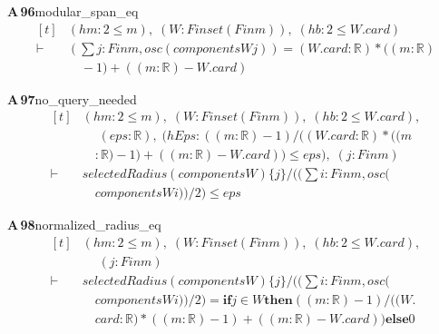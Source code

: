 \documentclass[conference]{IEEEtran}
\theoremstyle{definition}
\newcommand{\lean}[1]{\textsf{\footnotesize #1}}
\begin{document}
\noindent\textbf{A\,96}\quad\lean{modular\_span\_eq}
{\footnotesize\[ \begin{aligned}[t]
&(\mathit{hm} : 2 \leq \mathit{m}),\; (\mathit{W} : \mathit{Finset} (\mathit{Fin} \mathit{m})),\; (\mathit{hb} : 2 \leq \mathit{W}.\mathit{card})\\
\vdash\;&(\textstyle\sum \mathit{j} : \mathit{Fin} \mathit{m}, \mathit{osc} (\mathit{components} \mathit{W} \mathit{j})) = (\mathit{W}.\mathit{card} : \mathbb{R} )*((\mathit{m}:\mathbb{R} )\\
&\quad -1) + ((\mathit{m}:\mathbb{R} ) - \mathit{W}.\mathit{card})
\end{aligned} \]}

\noindent\textbf{A\,97}\quad\lean{no\_query\_needed}
{\footnotesize\[ \begin{aligned}[t]
&(\mathit{hm} : 2 \leq \mathit{m}),\; (\mathit{W} : \mathit{Finset} (\mathit{Fin} \mathit{m})),\; (\mathit{hb} : 2 \leq \mathit{W}.\mathit{card}),\\
&\quad \; (\mathit{eps} : \mathbb{R} ),\; (\mathit{hEps} : ((\mathit{m}:\mathbb{R} )-1)/((\mathit{W}.\mathit{card}:\mathbb{R} )*((\mathit{m}\\
&\quad :\mathbb{R} )-1) + ((\mathit{m}:\mathbb{R} ) - \mathit{W}.\mathit{card})) \leq \mathit{eps}),\; (\mathit{j} : \mathit{Fin} \mathit{m})\\
\vdash\;&\mathit{selectedRadius} (\mathit{components} \mathit{W}) \{ \mathit{j}\} / ((\textstyle\sum \mathit{i} : \mathit{Fin} \mathit{m}, \mathit{osc} (\\
&\quad \mathit{components} \mathit{W} \mathit{i}))/2) \leq \mathit{eps}
\end{aligned} \]}

\noindent\textbf{A\,98}\quad\lean{normalized\_radius\_eq}
{\footnotesize\[ \begin{aligned}[t]
&(\mathit{hm} : 2 \leq \mathit{m}),\; (\mathit{W} : \mathit{Finset} (\mathit{Fin} \mathit{m})),\; (\mathit{hb} : 2 \leq \mathit{W}.\mathit{card}),\\
&\quad \; (\mathit{j} : \mathit{Fin} \mathit{m})\\
\vdash\;&\mathit{selectedRadius} (\mathit{components} \mathit{W}) \{ \mathit{j}\} / ((\textstyle\sum \mathit{i} : \mathit{Fin} \mathit{m}, \mathit{osc} (\\
&\quad \mathit{components} \mathit{W} \mathit{i}))/2) = \mathbf{if} \mathit{j} \in \mathit{W} \mathbf{then} ((\mathit{m}:\mathbb{R} )-1)/((\mathit{W}.\\
&\quad \mathit{card}:\mathbb{R} )*((\mathit{m}:\mathbb{R} )-1) + ((\mathit{m}:\mathbb{R} ) - \mathit{W}.\mathit{card})) \mathbf{else} 0
\end{aligned} \]}
\end{document}

